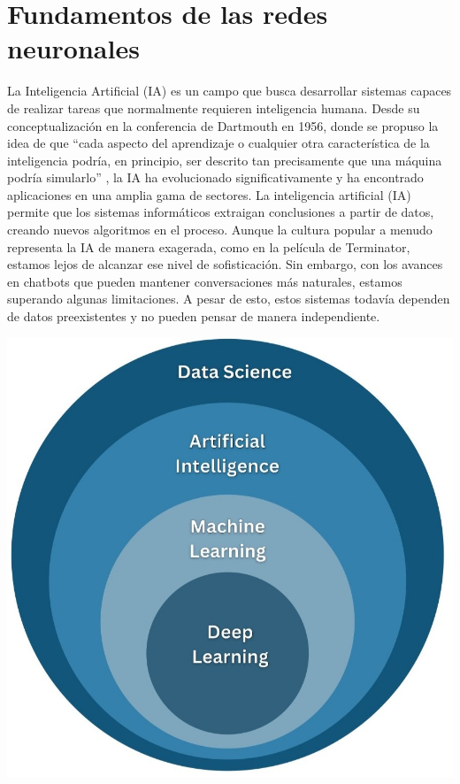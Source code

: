 \chapter{Fundamentos de las redes neuronales} \label{Capitulo_2}


\begin{minipage}{0.65\textwidth}
La Inteligencia Artificial (IA) es un campo que busca desarrollar sistemas capaces de realizar tareas que normalmente requieren inteligencia humana.  Desde su conceptualización en la conferencia de Dartmouth en 1956, donde se propuso la idea de que ``cada aspecto del aprendizaje o cualquier otra característica de la inteligencia podría, en principio, ser descrito tan precisamente que una máquina podría simularlo'' \citep{moor2006dartmouth}, la IA ha evolucionado significativamente y ha encontrado aplicaciones en una amplia gama de sectores. La inteligencia artificial (IA) permite que los sistemas informáticos extraigan conclusiones a partir de datos, creando nuevos algoritmos en el proceso. Aunque la cultura popular a menudo representa la IA de manera exagerada, como en la película de Terminator, estamos lejos de alcanzar ese nivel de sofisticación. Sin embargo, con los avances en chatbots que pueden mantener conversaciones más naturales, estamos superando algunas limitaciones. A pesar de esto, estos sistemas todavía dependen de datos preexistentes y no pueden pensar de manera independiente.
\end{minipage}
\begin{minipage}{0.05\textwidth}
\textbf{ }
\end{minipage}
\begin{minipage}{0.3\textwidth}
    \includegraphics[width=1.1\textwidth]{img/ia.jpg}
    \label{fig: ia}
\end{minipage}


